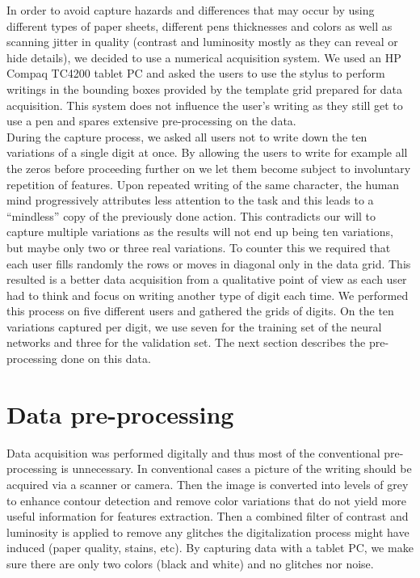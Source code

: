 \documentclass[a4paper]{article}
\begin{document}
{In order to avoid capture hazards and differences that may occur by using different types of paper sheets, different pens thicknesses and colors as well as scanning jitter in quality (contrast and luminosity mostly as they can reveal or hide details), we decided to use a numerical acquisition system. We used an HP Compaq TC4200 tablet PC and asked the users to use the stylus to perform writings in the bounding boxes provided by the template grid prepared for data acquisition. This system does not influence the user’s writing as they still get to use a pen and spares extensive pre-processing on the data.\\

During the capture process, we asked all users not to write down the ten variations of a single digit at once. By allowing the users to write for example all the zeros before proceeding further on we let them become subject to involuntary repetition of features. Upon repeated writing of the same character, the human mind progressively attributes less attention to the task and this leads to a “mindless” copy of the previously done action. This contradicts our will to capture multiple variations as the results will not end up being ten variations, but maybe only two or three real variations. To counter this we required that each user fills randomly the rows or moves in diagonal only in the data grid. This resulted is a better data acquisition from a qualitative point of view as each user had to think and focus on writing another type of digit each time. We performed this process on five different users and gathered the grids of digits. On the ten variations captured per digit, we use seven for the training set of the neural networks and three for the validation set. The next section describes the pre-processing done on this data.

\section{Data pre-processing}

Data acquisition was performed digitally and thus most of the conventional pre-processing is unnecessary. In conventional cases a picture of the writing should be acquired via a scanner or camera. Then the image is converted into levels of grey to enhance contour detection and remove color variations that do not yield more useful information for features extraction. Then a combined filter of contrast and luminosity is applied to remove any glitches the digitalization process might have induced (paper quality, stains, etc). By capturing data with a tablet PC, we make sure there are only two colors (black and white) and no glitches nor noise.\\

}
\end{document}
